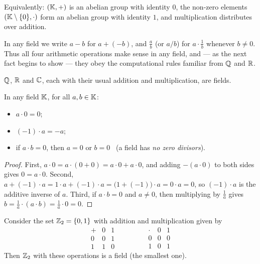 \begin{remark}
Equivalently: $(\mathbb{K},+)$ is an abelian group with identity $0$, the non-zero elements
$(\mathbb{K}\setminus\{0\},\cdot)$ form an abelian group with identity $1$, and multiplication distributes over
addition.
\end{remark}

\begin{remark}
In any field we write $a-b$ for $a+(-b)$, and $\tfrac{a}{b}$ (or $a/b$) for $a\cdot \tfrac1b$ whenever
$b\neq 0$. Thus all four arithmetic operations make sense in any field, and — as the next fact begins to
show — they obey the computational rules familiar from $\mathbb{Q}$ and $\mathbb{R}$.
\end{remark}

\begin{example}
$\mathbb{Q}$, $\mathbb{R}$ and $\mathbb{C}$, each with their usual addition and multiplication, are fields.
\end{example}

\begin{fact}
In any field $\mathbb{K}$, for all $a,b\in\mathbb{K}$:
\begin{itemize}
\item $a\cdot 0 = 0$;
\item $(-1)\cdot a = -a$;
\item if $a\cdot b = 0$, then $a=0$ or $b=0$ \ (a field has \emph{no zero divisors}).
\end{itemize}
\end{fact}

\begin{proof}
First, $a\cdot 0 = a\cdot(0+0) = a\cdot 0 + a\cdot 0$, and adding $-(a\cdot 0)$ to both sides gives
$0 = a\cdot 0$. Second, $a + (-1)\cdot a = 1\cdot a + (-1)\cdot a = \big(1+(-1)\big)\cdot a = 0\cdot a = 0$,
so $(-1)\cdot a$ is the additive inverse of $a$. Third, if $a\cdot b = 0$ and $a\neq 0$, then multiplying by
$\tfrac1a$ gives $b = \tfrac1a\cdot(a\cdot b) = \tfrac1a\cdot 0 = 0$.
\end{proof}

\begin{example}
Consider the set $\mathbb{Z}_2=\{0,1\}$ with addition and multiplication given by
\[
\begin{array}{c|cc} + & 0 & 1 \\ \hline 0 & 0 & 1 \\ 1 & 1 & 0 \end{array}
\qquad\qquad
\begin{array}{c|cc} \cdot & 0 & 1 \\ \hline 0 & 0 & 0 \\ 1 & 0 & 1 \end{array}
\]
Then $\mathbb{Z}_2$ with these operations is a field (the smallest one).
\end{example}

